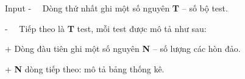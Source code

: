 Input
-   Dòng thứ nhất ghi một số nguyên \textbf{ T } – số bộ test.

-   Tiếp theo là \textbf{ T } test, mỗi test được mô tả như sau:

+ Dòng đàu tiên ghi một số nguyên \textbf{ N } – số lượng các hòn đảo.

+ \textbf{ N } dòng tiếp theo: mô tả bảng thống kê.